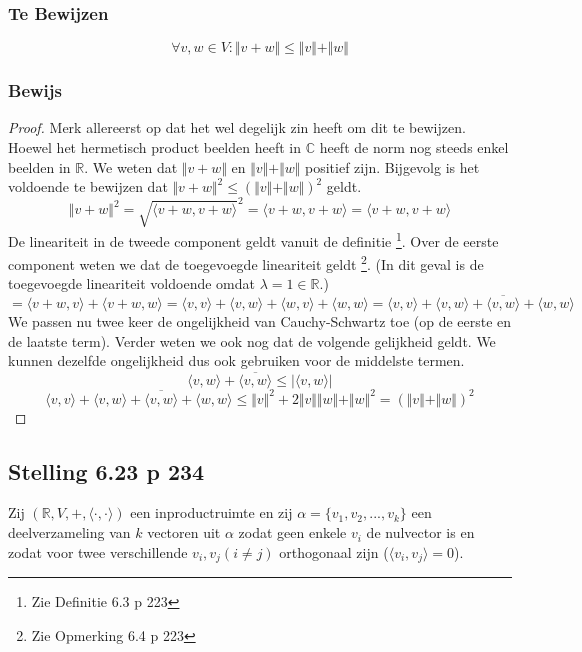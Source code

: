 \documentclass[lineaire_algebra_oplossingen.tex]{subfiles}
\begin{document}
\subsubsection*{Te Bewijzen}
\[
\forall v,w \in V: \Vert v+w \Vert \le \Vert v\Vert + \Vert w\Vert
\]

\subsubsection*{Bewijs}
\begin{proof}
Merk allereerst op dat het wel degelijk zin heeft om dit te bewijzen. Hoewel het hermetisch product beelden heeft in $\mathbb{C}$ heeft de norm nog steeds enkel beelden in $\mathbb{R}$.
We weten dat $\Vert v+w \Vert$ en $\Vert v\Vert + \Vert w\Vert$ positief zijn. Bijgevolg is het voldoende te bewijzen dat $\Vert v+w \Vert^2 \le (\Vert v\Vert + \Vert w\Vert)^2$ geldt.
\[
 \Vert v+w \Vert^2 = \sqrt{\langle v+w,v+w\rangle}^2 = \langle v+w,v+w\rangle = \langle v+w,v+w\rangle
\]
De lineariteit in de tweede component geldt vanuit de definitie \footnote{Zie Definitie 6.3 p 223}. Over de eerste component weten we dat de toegevoegde lineariteit geldt \footnote{Zie Opmerking 6.4 p 223}. (In dit geval is de toegevoegde lineariteit voldoende omdat $\lambda = 1 \in \mathbb{R}$.)
\[
= \langle v+w,v\rangle + \langle v+w,w\rangle = \langle v,v\rangle + \langle v,w\rangle + \langle w,v \rangle + \langle w,w \rangle = \langle v,v\rangle + \langle v,w\rangle + \overline{\langle v,w \rangle} + \langle w,w \rangle
\]
We passen nu twee keer de ongelijkheid van Cauchy-Schwartz toe (op de eerste en de laatste term). Verder weten we ook nog dat de volgende gelijkheid geldt. We kunnen dezelfde ongelijkheid dus ook gebruiken voor de middelste termen.
\[
\langle v,w\rangle + \overline{\langle v,w \rangle} \le \vert\langle v,w\rangle\vert
\]
\[
\langle v,v\rangle + \langle v,w\rangle + \overline{\langle v,w \rangle} + \langle w,w \rangle \le \Vert v\Vert^2 + 2\Vert v\Vert \Vert w\Vert + \Vert w\Vert^2 = (\Vert v\Vert + \Vert w\Vert)^2
\]
\end{proof}


\subsection{Stelling 6.23 p 234}
\label{6.23}
Zij $(\mathbb{R},V,+,\langle\cdot,\cdot\rangle)$ een inproductruimte en zij $\alpha = \{v_1,v_2,...,v_k\}$ een deelverzameling van $k$ vectoren uit $\alpha$ zodat geen enkele $v_i$ de nulvector is en zodat voor twee verschillende $v_i,v_j (i\neq j)$ orthogonaal zijn ($\langle v_i,v_j \rangle = 0$). 
\end{document}
